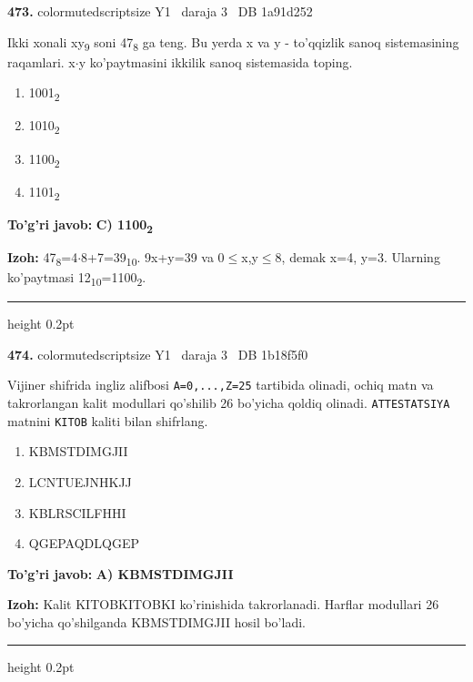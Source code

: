 \documentclass[10pt,a4paper,oneside]{article}
\begin{document}
\noindent\textbf{\color{ink}473.}  {color{muted}scriptsize Y1 \textbullet\ daraja 3 \textbullet\ DB 1a91d252}
\par
Ikki xonali xy\textsubscript{9} soni 47\textsubscript{8} ga teng. Bu yerda x va y - to'qqizlik sanoq sistemasining raqamlari. x\ensuremath{\cdot}y ko'paytmasini ikkilik sanoq sistemasida toping.
\begin{enumerate}[label=\Alph*),leftmargin=9mm]
\item 1001\textsubscript{2}
\item 1010\textsubscript{2}
\item 1100\textsubscript{2}
\item 1101\textsubscript{2}
\end{enumerate}
\begin{tcolorbox}[enhanced,breakable,colback=teal!4,colframe=teal!50!black,boxrule=0.5pt,arc=1.1mm,left=3mm,right=3mm,top=1.7mm,bottom=1.7mm,before skip=2mm,after skip=2mm]
\textbf{\color{teal}To'g'ri javob:} \textbf{C) 1100\textsubscript{2}}
\par\smallskip
\textbf{Izoh:} 47\textsubscript{8}=4\ensuremath{\cdot}8+7=39\textsubscript{1}\textsubscript{0}. 9x+y=39 va 0\ensuremath{\leq}x,y\ensuremath{\leq}8, demak x=4, y=3. Ularning ko'paytmasi 12\textsubscript{1}\textsubscript{0}=1100\textsubscript{2}.
\end{tcolorbox}
\vspace{2mm}\hrule height 0.2pt \vspace{3mm}

\noindent\textbf{\color{ink}474.}  {color{muted}scriptsize Y1 \textbullet\ daraja 3 \textbullet\ DB 1b18f5f0}
\par
Vijiner shifrida ingliz alifbosi \texttt{A=0,...,Z=25} tartibida olinadi, ochiq matn va takrorlangan kalit modullari qo'shilib 26 bo'yicha qoldiq olinadi. \texttt{ATTESTATSIYA} matnini \texttt{KITOB} kaliti bilan shifrlang.
\begin{enumerate}[label=\Alph*),leftmargin=9mm]
\item KBMSTDIMGJII
\item LCNTUEJNHKJJ
\item KBLRSCILFHHI
\item QGEPAQDLQGEP
\end{enumerate}
\begin{tcolorbox}[enhanced,breakable,colback=teal!4,colframe=teal!50!black,boxrule=0.5pt,arc=1.1mm,left=3mm,right=3mm,top=1.7mm,bottom=1.7mm,before skip=2mm,after skip=2mm]
\textbf{\color{teal}To'g'ri javob:} \textbf{A) KBMSTDIMGJII}
\par\smallskip
\textbf{Izoh:} Kalit KITOBKITOBKI ko'rinishida takrorlanadi. Harflar modullari 26 bo'yicha qo'shilganda KBMSTDIMGJII hosil bo'ladi.
\end{tcolorbox}
\vspace{2mm}\hrule height 0.2pt \vspace{3mm}
\end{document}
